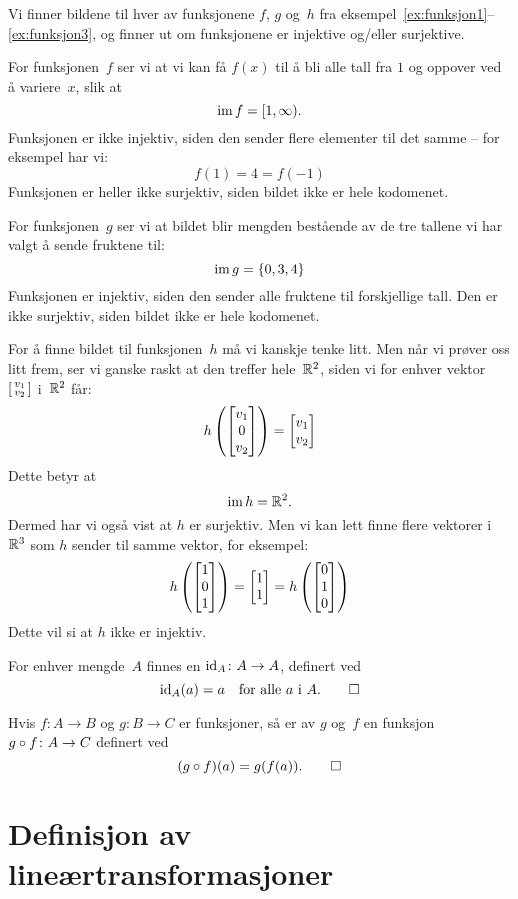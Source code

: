 \begin{ex}
Vi finner bildene til hver av funksjonene $f$, $g$ og~$h$ fra
eksempel~\ref{ex:funksjon1}--\ref{ex:funksjon3}, og finner ut om
funksjonene er injektive og/eller surjektive.

For funksjonen~$f$ ser vi at vi kan få $f(x)$ til å bli alle tall fra
$1$ og oppover ved å variere~$x$, slik at
\[
\operatorname{im} f = [ 1, \infty ).
\]
Funksjonen er ikke injektiv, siden den sender flere elementer til det
samme -- for eksempel har vi:
\[
f(1) = 4 = f(-1)
\]
Funksjonen er heller ikke surjektiv, siden bildet ikke er hele
kodomenet.

For funksjonen~$g$ ser vi at bildet blir mengden bestående av de tre
tallene vi har valgt å sende fruktene til:
\[
\operatorname{im} g = \{ 0, 3, 4 \}
\]
Funksjonen er injektiv, siden den sender alle fruktene til
forskjellige tall.  Den er ikke surjektiv, siden bildet ikke er hele
kodomenet.

For å finne bildet til funksjonen~$h$ må vi kanskje tenke litt.  Men
når vi prøver oss litt frem, ser vi ganske raskt at den treffer
hele~$\mathbb{R}^2$, siden vi for enhver vektor $\left[ \begin{smallmatrix} v_1 \\ v_2 \end{smallmatrix} \right]$ i~$\mathbb{R}^2$ får:
\[
h\left( \begin{bmatrix} v_1 \\ 0 \\ v_2 \end{bmatrix} \right) = \begin{bmatrix} v_1 \\ v_2 \end{bmatrix}
\]
Dette betyr at
\[
\operatorname{im} h = \mathbb{R}^2.
\]
Dermed har vi også vist at $h$ er surjektiv.  Men vi kan lett finne
flere vektorer i~$\mathbb{R}^3$ som $h$ sender til samme vektor, for eksempel:
\[
h\left(\begin{bmatrix} 1 \\ 0 \\ 1 \end{bmatrix}\right) = \begin{bmatrix} 1 \\ 1 \end{bmatrix} = h\left(\begin{bmatrix} 0 \\ 1 \\ 0 \end{bmatrix}\right)
\]
Dette vil si at $h$ ikke er injektiv.
\end{ex}


\begin{defn}
For enhver mengde~$A$ finnes en 
$\operatorname{id}_A \colon A \to A$, definert ved
\[
\operatorname{id}_A(a) = a \quad\text{for alle $a$ i~$A$.}
\qedhere
\]
\end{defn}

\begin{defn}
Hvis $f \colon A \to B$ og $g \colon B \to C$ er funksjoner, så er
 av $g$ og~$f$ en funksjon
$g \circ f \colon A \to C$ definert ved
\[
(g \circ f)(a) = g(f(a)).
\qedhere
\]
\end{defn}



\section*{Definisjon av lineærtransformasjoner}

